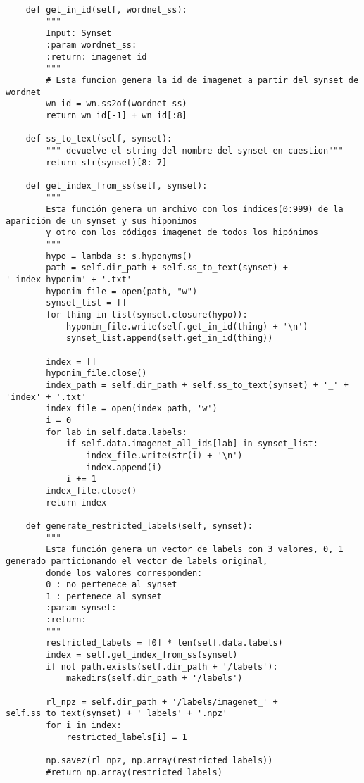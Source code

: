 \documentclass[12,twoside]{TFG-GM}
\theoremstyle{definition}
\theoremstyle{remark}
\begin{document}
\begin{verbatim}
    def get_in_id(self, wordnet_ss):
        """
        Input: Synset
        :param wordnet_ss:
        :return: imagenet id
        """
        # Esta funcion genera la id de imagenet a partir del synset de wordnet
        wn_id = wn.ss2of(wordnet_ss)
        return wn_id[-1] + wn_id[:8]

    def ss_to_text(self, synset):
        """ devuelve el string del nombre del synset en cuestion"""
        return str(synset)[8:-7]

    def get_index_from_ss(self, synset):
        """
        Esta función genera un archivo con los índices(0:999) de la aparición de un synset y sus hiponimos
        y otro con los códigos imagenet de todos los hipónimos
        """
        hypo = lambda s: s.hyponyms()
        path = self.dir_path + self.ss_to_text(synset) + '_index_hyponim' + '.txt'
        hyponim_file = open(path, "w")
        synset_list = []
        for thing in list(synset.closure(hypo)):
            hyponim_file.write(self.get_in_id(thing) + '\n')
            synset_list.append(self.get_in_id(thing))

        index = []
        hyponim_file.close()
        index_path = self.dir_path + self.ss_to_text(synset) + '_' + 'index' + '.txt'
        index_file = open(index_path, 'w')
        i = 0
        for lab in self.data.labels:
            if self.data.imagenet_all_ids[lab] in synset_list:
                index_file.write(str(i) + '\n')
                index.append(i)
            i += 1
        index_file.close()
        return index

    def generate_restricted_labels(self, synset):
        """
        Esta función genera un vector de labels con 3 valores, 0, 1 generado particionando el vector de labels original,
        donde los valores corresponden:
        0 : no pertenece al synset
        1 : pertenece al synset
        :param synset:
        :return:
        """
        restricted_labels = [0] * len(self.data.labels)
        index = self.get_index_from_ss(synset)
        if not path.exists(self.dir_path + '/labels'):
            makedirs(self.dir_path + '/labels')

        rl_npz = self.dir_path + '/labels/imagenet_' + self.ss_to_text(synset) + '_labels' + '.npz'
        for i in index:
            restricted_labels[i] = 1

        np.savez(rl_npz, np.array(restricted_labels))
        #return np.array(restricted_labels)


\end{verbatim}
\end{document}
